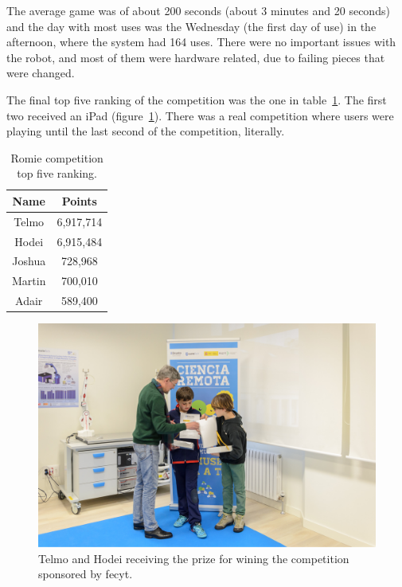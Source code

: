 The average game was of about 200 seconds (about 3 minutes and 20 seconds) and the day with most
uses was the Wednesday (the first day of use) in the afternoon, where the system had 164 uses. There
were no important issues with the robot, and most of them were hardware related, due to failing
pieces that were changed.

The final top five ranking of the competition was the one in table~\ref{tab:ranking}. The first two
received an iPad (figure~\ref{fig:prizes}). There was a real competition where users were playing
until the last second of the competition, literally.

\begin{table}[ht]
	\centering
	\caption{Romie competition top five ranking.}\label{tab:ranking}
	\begin{tabular}{cc}
		\toprule
		\textbf{Name} & \textbf{Points} \\
		\midrule
		Telmo		& 6,917,714	\\
		Hodei		& 6,915,484	\\
		Joshua		& 728,968	\\
		Martin		& 700,010	\\
		Adair		& 589,400	\\
		\bottomrule
	\end{tabular}
\end{table}

\begin{figure}[ht]
	\centering
	\includegraphics[height=0.3\textheight]{fig/prizes.jpg}
	\caption{Telmo and Hodei receiving the prize for wining the competition sponsored by \acrshort{fecyt}.}
	\label{fig:prizes}
\end{figure}

